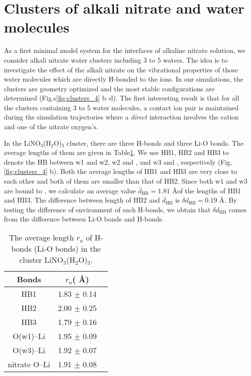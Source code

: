   \section{Clusters of alkali nitrate and water molecules}\label{paragraph_clusters_alkali_nitrate_and_water_molecules}
  As a first minimal model system for the interfaces of alkaline nitrate solution, we consider alkali nitrate water clusters including 3 to 5 waters. 
  The idea is to investigate the effect of the alkali nitrate on the vibrational properties of those water molecules which are directly 
  H-bonded to the ions.
  In our simulations, the clusters are geometry optimized and the most stable configurations are determined (Fig.s\thinspace\ref{fig:clusters_4} b--d).
  The first interesting result is that for all the clusters containing 3 to 5 water molecules, a contact ion pair is maintained during the 
  simulation trajectories where a \emph{direct} interaction involves the cation and one of the nitrate oxygen's. 

In the LiNO$_3$(H$_2$O)$_3$ cluster, there are three H-bonds and three Li-O bonds. 
The average lengths of them are given in Table\thinspace\ref{tab:table_lino3}. 
We use HB1, HB2 and HB3 to denote the HB between w1 and w2, w2 and \nitrate, and w3 and \nitrate, 
respectively (Fig.\thinspace\ref{fig:clusters_4} b). Both the average lengths of HB1 and HB3 are very close 
to each other and both of them are smaller than that of HB2. 
Since both w1 and w3 are bound to \li, we calculate an average value $\bar{d}_{\text{HB}}=1.81$ \AA of the lengths of HB1 and HB3.
The difference between length of HB2 and $\bar{d}_{\text{HB}}$ is $\delta d_{\text{HB}}=0.19$ \AA.
By testing the difference of environment of each H-bonds,  we obtain that $\delta d_{\text{HB}}$ comes from the 
difference between Li-O bonds and H-bonds.
\begin{table}[htbp]
\centering
\caption{\label{tab:table_lino3}%
  The average length $r_a$ of H-bonds (Li-O bonds) in the cluster LiNO$_3$(H$_2$O)$_3$.}
\begin{tabular}{ccc}
Bonds& $r_a$( \AA) \\ 
\hline
HB1 &1.83 $\pm$ 0.14\\
HB2 &2.00 $\pm$ 0.25 \\
HB3 &1.79 $\pm$ 0.16 \\
O(w1)--Li &1.95 $\pm$ 0.09 \\
O(w3)--Li &1.92 $\pm$ 0.07 \\
nitrate O--Li &1.91 $\pm$ 0.08
\end{tabular}
\end{table}

